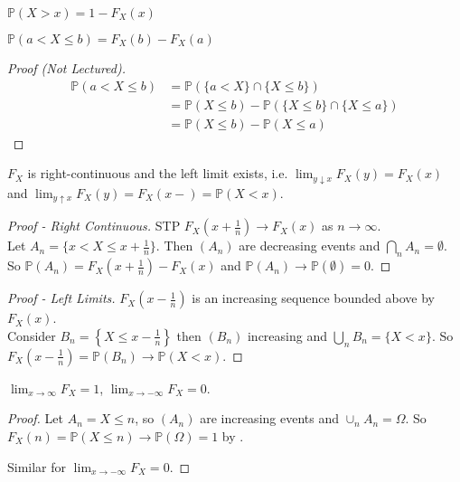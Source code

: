 \begin{claim}
    $\mathbb{P}(X > x) = 1 - F_X(x)$
\end{claim} 

\begin{claim}
    $\mathbb{P}(a < X \leq b) = F_X(b) - F_X(a)$
\end{claim} 

\begin{proof}[Proof (Not Lectured)]
    \begin{align*}
        \mathbb{P}(a<X\leq b) &= \mathbb{P}(\{a<X\}\cap \{X\leq b\}) \\
        &=\mathbb{P}(X\leq b) - \mathbb{P}(\{X\leq b\}\cap \{X\leq a\}) \\
        &=\mathbb{P}(X\leq b) - \mathbb{P}(X\leq a)
    \end{align*}
\end{proof}

\begin{claim}
    $F_X$ is right-continuous and the left limit exists, i.e. $\lim_{y \downarrow x} F_X(y) = F_X(x)$ and $\lim_{y \uparrow x} F_X(y) = F_X(x -) = \mathbb{P}(X < x)$.
\end{claim} 

\begin{proof}[Proof - Right Continuous]
    STP $F_X \left(x + \frac{1}{n}\right) \to F_X(x)$ as $n \to \infty$. \\
    Let $A_n = \{x<X\leq x+\frac{1}{n}\}$.
    Then $(A_n)$ are decreasing events and $\bigcap_n A_n = \emptyset$. \\
    So $\mathbb{P}(A_n) = F_X \left(x + \frac{1}{n}\right) - F_X(x)$ and $\mathbb{P}(A_n) \to \mathbb{P}(\emptyset) = 0$.
\end{proof} 

\begin{proof}[Proof - Left Limits]
    $F_X \left(x - \frac{1}{n}\right)$ is an increasing sequence bounded above by $F_X(x)$. \\
    Consider $B_n = \left\{X \leq x - \frac{1}{n}\right\}$ then $(B_n)$ increasing and $\bigcup_n B_n = \{X < x\}$.
    So $F_X \left(x - \frac{1}{n}\right) = \mathbb{P}(B_n) \to \mathbb{P}(X < x)$.
\end{proof} 

\begin{claim}
    $\lim_{x \to \infty} F_X = 1$, $\lim_{x \to - \infty} F_X = 0$.
\end{claim} 

\begin{proof}
    Let $A_n = {X \leq n}$, so $(A_n)$ are increasing events and $\cup_n A_n = \Omega$.
    So $F_X(n) = \mathbb{P}(X \leq n) \to \mathbb{P}(\Omega) = 1$ by .

    Similar for $\lim_{x \to - \infty} F_X = 0$.
\end{proof} 

